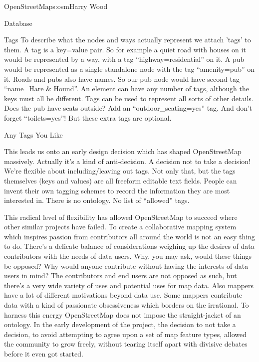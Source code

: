 \begin{aosachapter}{OpenStreetMap}{s:osm}{Harry Wood}
\begin{aosasect1}{Database}
\begin{aosasect2}{Tags}
To describe what the nodes and ways actually represent we attach
'tags' to them. A tag is a key=value pair. So for example a quiet road
with houses on it would be represented by a way, with a tag
``highway=residential'' on it. A pub would be represented as a single
standalone node with the tag ``amenity=pub'' on it. Roads and pubs
also have names. So our pub node would have second tag ``name=Hare \&
Hound''. An element can have any number of tags, although the keys
must all be different. Tags can be used to represent all sorts of
other details. Does the pub have seats outside? Add an
``outdoor\_seating=yes'' tag. And don't forget ``toilets=yes''! But
these extra tags are optional.

\end{aosasect2}

\begin{aosasect2}{Any Tags You Like}

This leads us onto an early design decision which has shaped
OpenStreetMap massively. Actually it's a kind of anti-decision. A
decision not to take a decision! We're flexible about
including/leaving out tags. Not only that, but the tags themselves
(keys and values) are all freeform editable text fields. People can
invent their own tagging schemes to record the information they are
most interested in. There is no ontology. No list of ``allowed'' tags.

This radical level of flexibility has allowed OpenStreetMap to succeed
where other similar projects have failed. To create a collaborative
mapping system which inspires passion from contributors all around the
world is not an easy thing to do. There's a delicate balance of
considerations weighing up the desires of data contributors with the
needs of data users. Why, you may ask, would these things be opposed?
Why would anyone contribute without having the interests of data users
in mind? The contributors and end users are not opposed as such, but
there's a very wide variety of uses and potential uses for map
data. Also mappers have a lot of different motivations beyond data
use. Some mappers contribute data with a kind of passionate
obsessiveness which borders on the irrational. To harness this energy
OpenStreetMap does not impose the straight-jacket of an ontology. In
the early development of the project, the decision to not take a
decision, to avoid attempting to agree upon a set of map feature
types, allowed the community to grow freely, without tearing itself
apart with divisive debates before it even got started.


\end{aosasect2}
\end{aosasect1}
\end{aosachapter}
